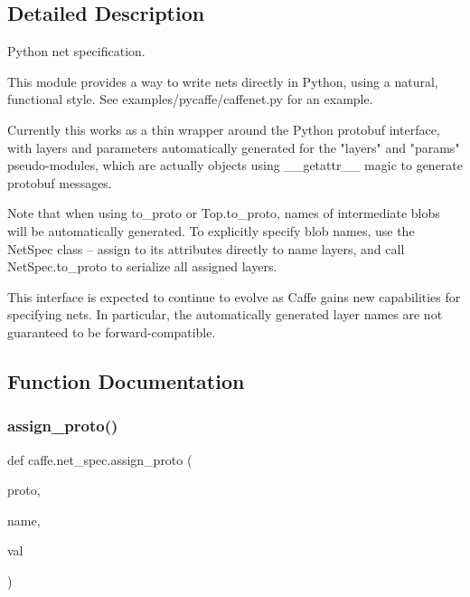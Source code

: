 \subsection{Detailed Description}
\begin{DoxyVerb}Python net specification.

This module provides a way to write nets directly in Python, using a natural,
functional style. See examples/pycaffe/caffenet.py for an example.

Currently this works as a thin wrapper around the Python protobuf interface,
with layers and parameters automatically generated for the "layers" and
"params" pseudo-modules, which are actually objects using __getattr__ magic
to generate protobuf messages.

Note that when using to_proto or Top.to_proto, names of intermediate blobs will
be automatically generated. To explicitly specify blob names, use the NetSpec
class -- assign to its attributes directly to name layers, and call
NetSpec.to_proto to serialize all assigned layers.

This interface is expected to continue to evolve as Caffe gains new capabilities
for specifying nets. In particular, the automatically generated layer names
are not guaranteed to be forward-compatible.
\end{DoxyVerb}
 

\subsection{Function Documentation}
\mbox{\label{namespacecaffe_1_1net__spec_a823515c8ca21e9562ea594546e167da2}} 
\subsubsection{\texorpdfstring{assign\+\_\+proto()}{assign\_proto()}}
{\footnotesize\ttfamily def caffe.\+net\+\_\+spec.\+assign\+\_\+proto (\begin{DoxyParamCaption}\item[{}]{proto,  }\item[{}]{name,  }\item[{}]{val }\end{DoxyParamCaption})}


